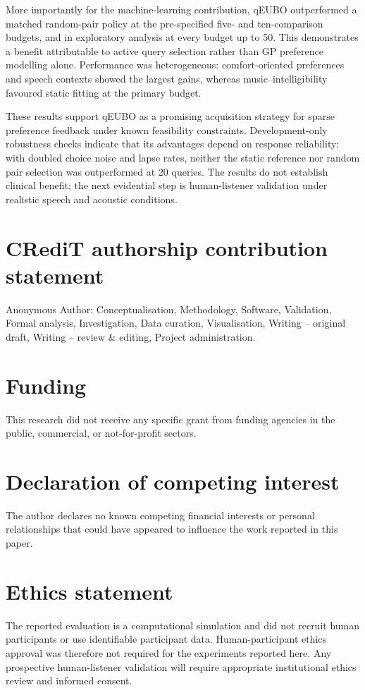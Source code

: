 \documentclass[preprint,12pt]{elsarticle}
\begin{document}
More importantly for the machine-learning contribution, qEUBO outperformed a matched random-pair policy at the pre-specified five- and ten-comparison budgets, and in exploratory analysis at every budget up to 50. This demonstrates a benefit attributable to active query selection rather than GP preference modelling alone. Performance was heterogeneous: comfort-oriented preferences and speech contexts showed the largest gains, whereas music--intelligibility favoured static fitting at the primary budget.

These results support qEUBO as a promising acquisition strategy for sparse preference feedback under known feasibility constraints. Development-only robustness checks indicate that its advantages depend on response reliability: with doubled choice noise and lapse rates, neither the static reference nor random pair selection was outperformed at 20 queries. The results do not establish clinical benefit; the next evidential step is human-listener validation under realistic speech and acoustic conditions.

\section*{CRediT authorship contribution statement}
Anonymous Author: Conceptualisation, Methodology, Software, Validation, Formal analysis, Investigation, Data curation, Visualisation, Writing -- original draft, Writing -- review \& editing, Project administration.

\section*{Funding}
This research did not receive any specific grant from funding agencies in the public, commercial, or not-for-profit sectors.

\section*{Declaration of competing interest}
The author declares no known competing financial interests or personal relationships that could have appeared to influence the work reported in this paper.

\section*{Ethics statement}
The reported evaluation is a computational simulation and did not recruit human participants or use identifiable participant data. Human-participant ethics approval was therefore not required for the experiments reported here. Any prospective human-listener validation will require appropriate institutional ethics review and informed consent.
\end{document}
